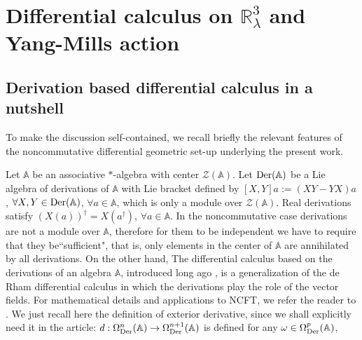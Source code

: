 \documentclass[a4paper,11pt]{article}
\numberwithin{equation}{section}
\newcommand\bbbone{\mathbb{I}}
\newcommand\caZ{{\mathcal Z}}
\newcommand\algebA{{\mathbb A}}
\newcommand\calg{{{\cal{G}}}}
\newcommand\DER{{\text{\textup{Der}}}}
\theoremstyle{nonumberplain}
\begin{document}
\section{\texorpdfstring{Differential calculus on $\mathbb{R}^3_\lambda$ and Yang-Mills action}{Diff calcul}}\label{section2}

\subsection{Derivation based differential calculus in a nutshell}\label{subsection21}

To make the discussion self-contained, we recall briefly the relevant features of the noncommutative differential geometric set-up underlying the present work. 

Let $\algebA$ be an associative $*$-algebra
with center $\caZ(\algebA)$. Let $\DER(\algebA)$ be a Lie algebra of derivations of $\algebA$ with Lie bracket defined by $[X,Y]a:=(XY-YX)a$, $\forall X,Y\in\DER(\algebA)$, $\forall a\in\algebA$, which is only  a module over $\caZ(\algebA)$. Real derivations satisfy $(X(a))^\dag=X(a^\dag)$, $\forall a\in\algebA$. In the noncommutative case derivations are not a module over $\algebA$, therefore for them to be independent  we have to require that they be``sufficient", that is, only elements in the center of $\algebA$ are annihilated by all derivations.  On the other hand, 
The differential calculus based on the derivations of an algebra $\algebA$, introduced  long ago \cite{segal, dbv1, marmolandi, dbv2},  is a generalization of the de Rham differential calculus in which the derivations play the role of the vector fields. For mathematical details and applications to NCFT, we refer the reader to  \cite{ Marmo:2004re, Wallet:2008bq, Wallet:2011cmj, Wallet:2008b}. We just recall here the definition of exterior derivative, since we shall explicitly need  it in the article: 
$
d:{\Omega}^n_{\DER}(\algebA)\to{\Omega}^{n+1}_{\DER}(\algebA)$ is defined for any 
$\omega\in{\Omega}^p_{\DER}(\algebA)$,
\end{document}
